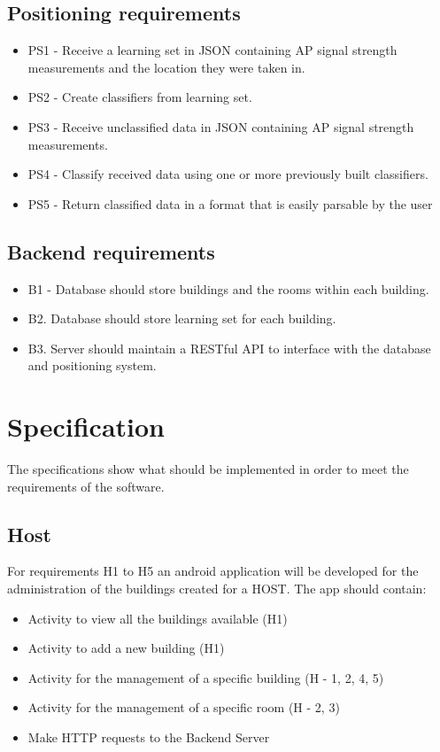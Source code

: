 \subsection{Positioning requirements}
	\begin{itemize}
		\item PS1 - Receive a learning set in JSON containing AP signal strength measurements and the 			location they were taken in.
		\item PS2 - Create classifiers from learning set.
		\item PS3 - Receive unclassified data in JSON containing AP signal strength measurements.
		\item PS4 - Classify received data using one or more previously built classifiers.
		\item PS5 - Return classified data in a format that is easily parsable by the user
	\end{itemize}

\subsection{Backend requirements}
	\begin{itemize}
		\item B1 - Database should store buildings and the rooms within each building. 
		\item B2. Database should store learning set for each building.
		\item B3. Server should maintain a RESTful API to interface with the database and positioning 			system.
	\end{itemize}


\section{Specification}
The specifications show what should be implemented in order to meet the requirements of the software.

\subsection{Host}
For requirements H1 to H5 an android application will be developed for the administration of the buildings created for a HOST. The app should contain:
	\begin{itemize}
		\item Activity to view all the buildings available (H1)
		\item Activity to add a new building (H1)
		\item Activity for the management of a specific building (H - 1, 2, 4, 5)
		\item Activity for the management of a specific room (H - 2, 3)
		\item Make HTTP requests to the Backend Server
	\end{itemize}

